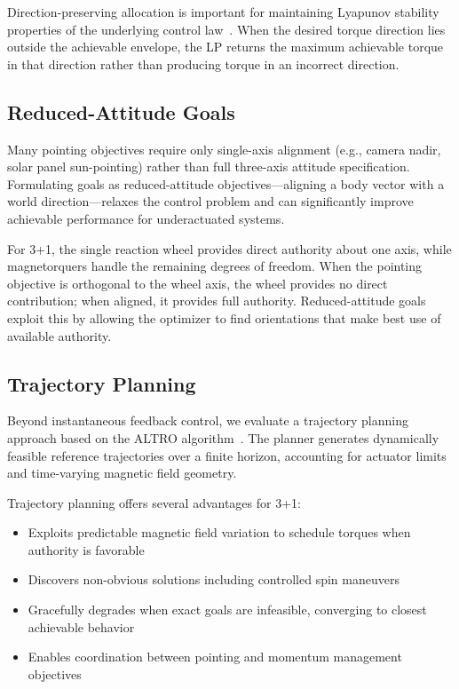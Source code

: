 \documentclass[9pt]{extarticle}
\begin{document}
Direction-preserving allocation is important for maintaining Lyapunov stability properties of the underlying control law~\cite{mckeen2024generalized}. When the desired torque direction lies outside the achievable envelope, the LP returns the maximum achievable torque in that direction rather than producing torque in an incorrect direction.

\subsection{Reduced-Attitude Goals}

Many pointing objectives require only single-axis alignment (e.g., camera nadir, solar panel sun-pointing) rather than full three-axis attitude specification. Formulating goals as reduced-attitude objectives---aligning a body vector with a world direction---relaxes the control problem and can significantly improve achievable performance for underactuated systems.

For 3+1, the single reaction wheel provides direct authority about one axis, while magnetorquers handle the remaining degrees of freedom. When the pointing objective is orthogonal to the wheel axis, the wheel provides no direct contribution; when aligned, it provides full authority. Reduced-attitude goals exploit this by allowing the optimizer to find orientations that make best use of available authority.

\subsection{Trajectory Planning}

Beyond instantaneous feedback control, we evaluate a trajectory planning approach based on the ALTRO algorithm~\cite{howell2019altro}. The planner generates dynamically feasible reference trajectories over a finite horizon, accounting for actuator limits and time-varying magnetic field geometry.

Trajectory planning offers several advantages for 3+1:
\begin{itemize}
    \item Exploits predictable magnetic field variation to schedule torques when authority is favorable
    \item Discovers non-obvious solutions including controlled spin maneuvers
    \item Gracefully degrades when exact goals are infeasible, converging to closest achievable behavior
    \item Enables coordination between pointing and momentum management objectives
\end{itemize}
\end{document}
